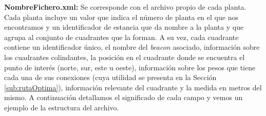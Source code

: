 

\textbf{NombreFichero.xml:} Se corresponde con el archivo propio de cada planta. Cada planta incluye un valor que indica el número de planta en el que nos encontramos y un identificador de estancia que da nombre a la planta y que agrupa al conjunto de cuadrantes que la forman. A su vez, cada cuadrante contiene un identificador único, el nombre del \textit{beacon} asociado, información sobre los cuadrantes colindantes, la posición en el cuadrante donde se encuentra el punto de interés (norte, sur, este u oeste), información sobre los pesos que tiene cada una de sus conexiones (cuya utilidad se presenta en la Sección \ref{sub:rutaOptima}), información relevante del cuadrante y la medida en metros del mismo. A continuación detallamos el significado de cada campo y vemos un ejemplo de la estructura del archivo.

